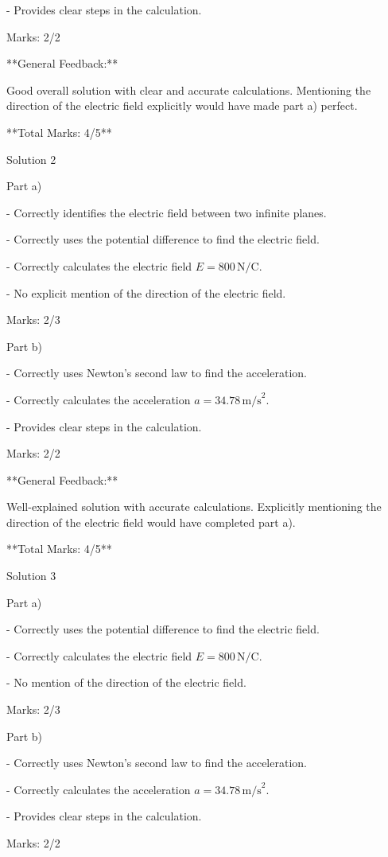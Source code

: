 \documentclass[a4paper,11pt]{article}
\begin{document}
- Provides clear steps in the calculation.

Marks: 2/2

**General Feedback:**

Good overall solution with clear and accurate calculations. Mentioning the direction of the electric field explicitly would have made part a) perfect.

**Total Marks: 4/5**

Solution 2

Part a)

- Correctly identifies the electric field between two infinite planes.

- Correctly uses the potential difference to find the electric field.

- Correctly calculates the electric field \( E = 800 \, \text{N/C} \).

- No explicit mention of the direction of the electric field.

Marks: 2/3

Part b)

- Correctly uses Newton’s second law to find the acceleration.

- Correctly calculates the acceleration \( a = 34.78 \, \text{m/s}^2 \).

- Provides clear steps in the calculation.

Marks: 2/2

**General Feedback:**

Well-explained solution with accurate calculations. Explicitly mentioning the direction of the electric field would have completed part a).

**Total Marks: 4/5**

Solution 3

Part a)

- Correctly uses the potential difference to find the electric field.

- Correctly calculates the electric field \( E = 800 \, \text{N/C} \).

- No mention of the direction of the electric field.

Marks: 2/3

Part b)

- Correctly uses Newton’s second law to find the acceleration.

- Correctly calculates the acceleration \( a = 34.78 \, \text{m/s}^2 \).

- Provides clear steps in the calculation.

Marks: 2/2
\end{document}
